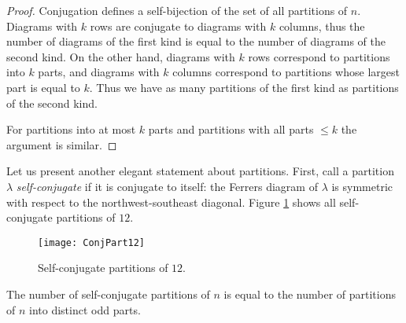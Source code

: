 \begin{page}
\setcounter{section}{3}
\setcounter{subsection}{6}
\setcounter{dfn}{15}
\label{portion:934}

\begin{proof}
Conjugation defines a self-bijection of the set of all partitions of $n$.
Diagrams with $k$ rows are conjugate to diagrams with $k$ columns,
thus the number of diagrams of the first kind is equal to the number of diagrams of the second kind.
On the other hand, diagrams with $k$ rows correspond to partitions into $k$ parts,
and diagrams with $k$ columns correspond to partitions whose largest part is equal to $k$.
Thus we have as many partitions of the first kind as partitions of the second kind.

For partitions into at most $k$ parts and partitions with all parts $\le k$ the argument is similar.
\end{proof}


Let us present another elegant statement about partitions.
First, call a partition $\lambda$ \emph{self-conjugate} if it is conjugate to itself:
the Ferrers diagram of $\lambda$ is symmetric with respect to the northwest-southeast diagonal.
Figure \ref{fig:FerrersSelfConj} shows all self-conjugate partitions of $12$.

\begin{figure}[ht]
\begin{center}
\texttt{[image: ConjPart12]}
\end{center}
\caption{Self-conjugate partitions of $12$.}
\label{fig:FerrersSelfConj}
\end{figure}



\end{page}

\begin{page}
\setcounter{section}{3}
\setcounter{subsection}{6}
\setcounter{dfn}{16}
\label{portion:936}

\begin{thm}
The number of self-conjugate partitions of $n$ is equal to the number of partitions of $n$ into distinct odd parts.
\end{thm}

\end{page}

